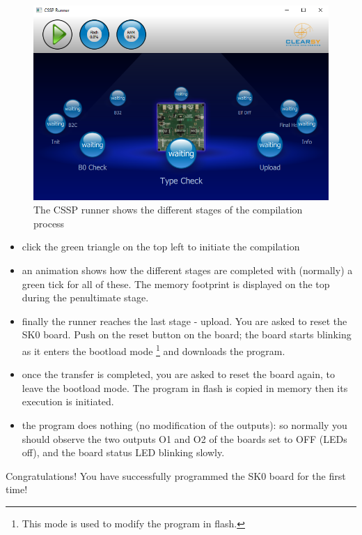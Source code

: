   \begin{figure}[ht]
\centering\includegraphics[scale=0.4]{Pictures/chapterProgramming/FIRSTRUN-create-project-006.png}
\caption{The CSSP runner shows the different stages of the compilation process}
\label{install:cssp-runner}
\end{figure}  
    
\begin{itemize}    
    
    \item click the green triangle on the top left to initiate the compilation
    \item an animation shows how the different stages are completed with (normally) a green tick for all of these. The memory footprint is displayed on the top during the penultimate stage. 
    \item finally the runner reaches the last stage - upload. You are asked to reset the SK0 board. Push on the reset button on the board; the board starts blinking as it enters the bootload mode \footnote{This mode is used to modify the program in flash.} and downloads the program.
    \item once the transfer is completed, you are asked to reset the board again, to leave the bootload mode. The program in flash is copied in memory then its execution is initiated.
    \item the program does nothing (no modification of the outputs): so normally you should observe the two outputs O1 and O2 of the boards set to OFF (LEDs off), and the board status LED blinking slowly. 
\end{itemize}
Congratulations! You have successfully programmed the SK0 board for the first time!

